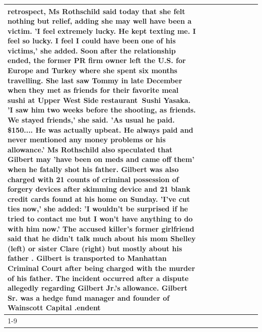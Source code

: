 \begin{table}[H]
\begin{tabular}{lllrlllll}
retrospect, Ms Rothschild said today that she felt nothing but relief, adding she may well have been a victim. 'I feel extremely lucky. He kept texting me. I feel so lucky. I feel I could have been one of his victims,' she added. Soon after the relationship ended, the former PR firm owner left the U.S. for Europe and Turkey where she spent six months  travelling. She last saw Tommy in late December when they met as friends for their favorite meal sushi at Upper West Side restaurant Sushi Yasaka. 'I saw him two weeks before the shooting, as friends. We stayed friends,' she said. 'As usual he paid. \$150.... He was actually upbeat. He always paid and never mentioned any money problems or his allowance.' Ms Rothschild also speculated that Gilbert may 'have been on meds and came off them' when he fatally shot his father. Gilbert was also charged with 21 counts of criminal possession of forgery devices after skimming device and 21 blank credit cards found at his home on Sunday. 'I've cut ties now,' she added: 'I wouldn’t be surprised if he tried to contact me but I won’t have anything to do with him now.' The accused killer's former girlfriend said that he didn't talk much about his mom Shelley (left) or sister Clare (right) but mostly about his father . Gilbert is transported to Manhattan Criminal Court  after being charged with the murder of his father. The incident occurred after a dispute allegedly regarding Gilbert Jr.'s allowance. Gilbert Sr. was a hedge fund manager and founder of Wainscott Capital .endent \\
\cline{1-9} \cline{2-9}

\end{tabular}
\end{table}

